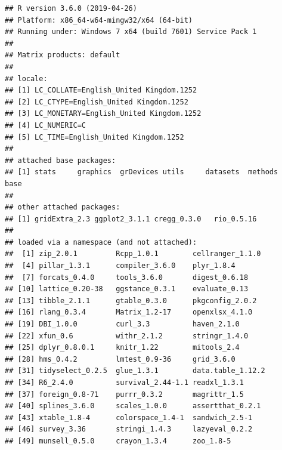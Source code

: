 \documentclass[a4paper,12pt]{article}\usepackage[]{graphicx}\usepackage[]{color}
\makeatletter
\newenvironment{kframe}{%
 \def\at@end@of@kframe{}%
 \ifinner\ifhmode%
  \def\at@end@of@kframe{\end{minipage}}%
  \begin{minipage}{\columnwidth}%
 \fi\fi%
 \def\FrameCommand##1{\hskip\@totalleftmargin \hskip-\fboxsep
 \colorbox{shadecolor}{##1}\hskip-\fboxsep
     \hskip-\linewidth \hskip-\@totalleftmargin \hskip\columnwidth}%
 \MakeFramed {\advance\hsize-\width
   \@totalleftmargin\z@ \linewidth\hsize
   \@setminipage}}%
 {\par\unskip\endMakeFramed%
 \at@end@of@kframe}
\newenvironment{knitrout}{}{} %
\makeatother
\begin{document}
\begin{knitrout}
\color{fgcolor}\begin{kframe}
\begin{verbatim}
## R version 3.6.0 (2019-04-26)
## Platform: x86_64-w64-mingw32/x64 (64-bit)
## Running under: Windows 7 x64 (build 7601) Service Pack 1
## 
## Matrix products: default
## 
## locale:
## [1] LC_COLLATE=English_United Kingdom.1252 
## [2] LC_CTYPE=English_United Kingdom.1252   
## [3] LC_MONETARY=English_United Kingdom.1252
## [4] LC_NUMERIC=C                           
## [5] LC_TIME=English_United Kingdom.1252    
## 
## attached base packages:
## [1] stats     graphics  grDevices utils     datasets  methods   base     
## 
## other attached packages:
## [1] gridExtra_2.3 ggplot2_3.1.1 cregg_0.3.0   rio_0.5.16   
## 
## loaded via a namespace (and not attached):
##  [1] zip_2.0.1         Rcpp_1.0.1        cellranger_1.1.0 
##  [4] pillar_1.3.1      compiler_3.6.0    plyr_1.8.4       
##  [7] forcats_0.4.0     tools_3.6.0       digest_0.6.18    
## [10] lattice_0.20-38   ggstance_0.3.1    evaluate_0.13    
## [13] tibble_2.1.1      gtable_0.3.0      pkgconfig_2.0.2  
## [16] rlang_0.3.4       Matrix_1.2-17     openxlsx_4.1.0   
## [19] DBI_1.0.0         curl_3.3          haven_2.1.0      
## [22] xfun_0.6          withr_2.1.2       stringr_1.4.0    
## [25] dplyr_0.8.0.1     knitr_1.22        mitools_2.4      
## [28] hms_0.4.2         lmtest_0.9-36     grid_3.6.0       
## [31] tidyselect_0.2.5  glue_1.3.1        data.table_1.12.2
## [34] R6_2.4.0          survival_2.44-1.1 readxl_1.3.1     
## [37] foreign_0.8-71    purrr_0.3.2       magrittr_1.5     
## [40] splines_3.6.0     scales_1.0.0      assertthat_0.2.1 
## [43] xtable_1.8-4      colorspace_1.4-1  sandwich_2.5-1   
## [46] survey_3.36       stringi_1.4.3     lazyeval_0.2.2   
## [49] munsell_0.5.0     crayon_1.3.4      zoo_1.8-5
\end{verbatim}
\end{kframe}
\end{knitrout}
\end{document}
